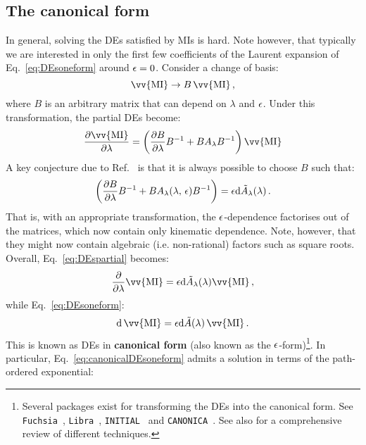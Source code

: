 \documentclass[main.tex]{subfiles}
\begin{document}
\subsection{The canonical form}
In general, solving the DEs satisfied by MIs is hard. Note however, that typically we are interested in only the first few coefficients of the Laurent expansion of Eq.~\ref{eq:DEsoneform} around $\epsilon=0$. Consider a change of basis:
\begin{equation} \label{eq:basistransformation}
    \vv{\text{MI}} \rightarrow B\,\vv{\text{MI}}\,,
\end{equation}
where $B$ is an arbitrary matrix that can depend on $\lambda$ and $\epsilon$. Under this transformation, the partial DEs become:
\begin{equation}
    \frac{\partial \vv{\text{MI}}}{\partial \lambda} = \left( \frac{\partial B}{\partial \lambda}B^{-1} + B A_{\lambda} B^{-1} \right) \vv{\text{MI}}
\end{equation}
A key conjecture due to Ref.~\cite{Henn:2013pwa} is that it is always possible to choose $B$ such that:
\begin{equation}
    \left( \frac{\partial B}{\partial \lambda}B^{-1} + B A_{\lambda}(\lambda, \, \epsilon) B^{-1} \right) = \epsilon \mathrm{d} \tilde{A}_{\lambda}(\lambda)\,.
\end{equation}
That is, with an appropriate transformation, the $\epsilon$-dependence factorises out of the matrices, which now contain only kinematic dependence. Note, however, that they might now contain algebraic (i.e. non-rational) factors such as square roots. Overall, Eq.~\ref{eq:DEspartial} becomes:
\begin{equation} \label{eq:canonicalDEspartial}
    \frac{\partial}{\partial \lambda} \vv{\text{MI}} = \eps\dd \tilde{A}_{\lambda}(\lambda) \vv{\text{MI}}\,, 
\end{equation}
while Eq.~\ref{eq:DEsoneform}:
\begin{equation} \label{eq:canonicalDEsoneform}
    \dd \,\vv{\text{MI}} = \eps \dd \tilde{A}(\lambda) \,\vv{\text{MI}}\,.
\end{equation}
This is known as DEs in \textbf{canonical form} (also known as the $\epsilon$-form)\footnote{Several packages exist for transforming the DEs into the canonical form. See \texttt{Fuchsia}~\cite{Gituliar:2017vzm}, \texttt{Libra}~\cite{Lee:2020zfb}, \texttt{INITIAL}~\cite{Dlapa:2020cwj} and \texttt{CANONICA}~\cite{Meyer:2018feh}. See also \cite{Dlapa:2022nct} for a comprehensive review of different techniques.}. In particular, Eq.~\ref{eq:canonicalDEsoneform} admits a solution in terms of the path-ordered exponential:
\end{document}
